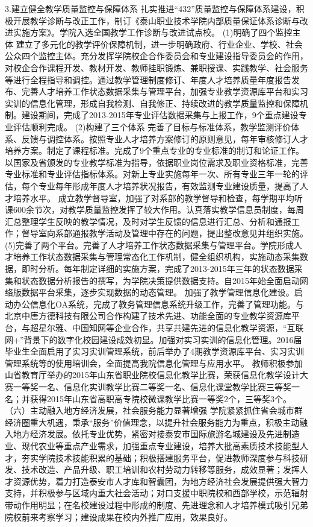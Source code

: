3.建立健全教学质量监控与保障体系
扎实推进“432”质量监控与保障体系建设，积极开展教学诊断与改正工作，制订《泰山职业技术学院内部质量保证体系诊断与改进实施方案》。学院入选全国教学工作诊断与改进试点校。
(1)明确了四个监控主体
建立了多元化的教学评价保障机制，进一步明确政府、行业企业、学校、社会公众四个监控主体。充分发挥学院校企合作委员会和专业建设指导委员会的作用，对校企合作课程开发、教材开发、教师挂职锻炼、兼职授课、实践教学、社会服务等进行全程指导和调控。通过教学管理制度修订、年度人才培养质量年度报告发布、完善人才培养工作状态数据采集与管理平台，加强专业教学资源库平台和实习实训的信息化管理，形成自我检测、自我修正、持续改进的教学质量监控和保障机制。建设期间，完成了2013-2015年专业评估数据采集与上报工作，9个重点建设专业评估顺利完成。
(2)构建了三个体系
完善了目标与标准体系，教学监测评价体系、反馈与调控体系。按照专业人才培养方案修订的原则意见，每年审核修订人才培养方案。制定了课程标准。完成了9个重点专业的专业标准的制订和论证工作。
以国家及省颁发的专业教学标准为指导，依据职业岗位需求及职业资格标准，完善专业标准和专业评估指标体系。对新上专业实施每年一次、所有专业三年一轮的评估，每个专业每年形成年度人才培养状况报告，有效监测专业建设质量，提高了人才培养水平。
成立教学督导室，加强了对系部的教学督导和检查，每学期平均听课600余节次，对教学质量监控发挥了较大作用。认真落实教学信息员制度，每周汇总整理学生反映的教学情况，及时对学生反馈的信息进行汇总、分析和通报工作；督导室向系部通报教学活动及管理中存在的问题，提出整改意见并组织实施。
(5)完善了两个平台。完善了人才培养工作状态数据采集与管理平台。学院形成人才培养工作状态数据采集与管理常态化工作机制，健全组织机构，实施动态采集数据，即时分析。每年制定详细的实施方案，完成了2013-2015年三年的状态数据采集和状态数据分析报告的撰写，为学院决策提供数据支持。自2015年始全面启动网络版数据平台采集，逐步实现数据的动态管理。
加强了教学管理信息化建设。启动办公信息化OA系统，完成了教务管理信息系统升级工作，完善了管理功能。与北京中唐方德科技有限公司合作构建了技术先进、功能全面的专业教学资源库平台，与超星尔雅、中国知网等企业合作，共享共建先进的信息化教学资源，“互联网+”背景下的数字化校园建设成效初显。加强对实习实训的信息化管理。2016届毕业生全面启用了实习实训管理系统，前后举办了4期教学资源库平台、实习实训管理系统等的使用培训会，全面提高我院信息化管理与应用水平。
教师积极参加山省教育厅举办的2015年山东省职业院校信息化教学比赛，荣获信息化教学设计大赛一等奖一名、信息化实训教学比赛二等奖一名、信息化课堂教学比赛三等奖一名；并获得2015年山东省高职高专院校微课教学比赛一等奖2个，三等奖3个。
（六）主动融入地方经济发展，社会服务能力显著增强
学院紧紧抓住省会城市群经济圈重大机遇，秉承“服务”价值理念，以提升社会服务能力为重点，积极主动融入地方经济发展。依托专业优势，紧密对接泰安市国际旅游名城建设及先进制造业、现代农业等重点产业需求，加强重点专业建设，培养大批高素质技术技能型人才，夯实学院技术技能积累的基础；积极搭建服务平台，促进教师深度参与科技研发、技术改造、产品升级、职工培训和农村劳动力转移等服务，成效显著；发挥人才资源优势，着力打造泰安市人才库和智囊团，为地方经济社会发展提供强大智力支持，并积极参与区域内重大社会活动；对口支援中职院校和西部学校，示范辐射带动作用明显；在名校建设过程中形成的制度、先进理念和人才培养模式吸引兄弟院校前来考察学习；建设成果在校内外推广应用，效果良好。
